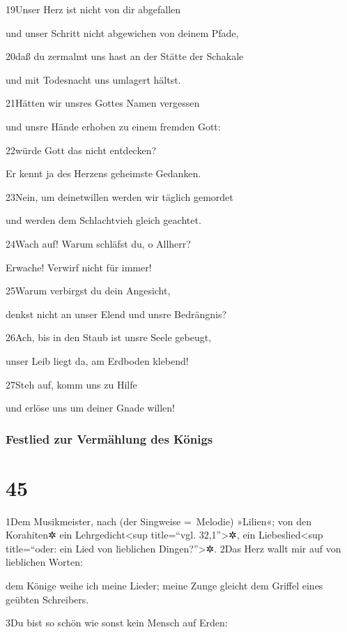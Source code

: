 19Unser Herz ist nicht von dir abgefallen

und unser Schritt nicht abgewichen von deinem Pfade,

20daß du zermalmt uns hast an der Stätte der Schakale

und mit Todesnacht uns umlagert hältst.

21Hätten wir unsres Gottes Namen vergessen

und unsre Hände erhoben zu einem fremden Gott:

22würde Gott das nicht entdecken?

Er kennt ja des Herzens geheimste Gedanken.

23Nein, um deinetwillen werden wir täglich gemordet

und werden dem Schlachtvieh gleich geachtet.

24Wach auf! Warum schläfst du, o Allherr?

Erwache! Verwirf nicht für immer!

25Warum verbirgst du dein Angesicht,

denkst nicht an unser Elend und unsre Bedrängnis?

26Ach, bis in den Staub ist unsre Seele gebeugt,

unser Leib liegt da, am Erdboden klebend!

27Steh auf, komm uns zu Hilfe

und erlöse uns um deiner Gnade willen!

\hypertarget{festlied-zur-vermuxe4hlung-des-kuxf6nigs}{%
\subsubsection{Festlied zur Vermählung des
Königs}\label{festlied-zur-vermuxe4hlung-des-kuxf6nigs}}

\hypertarget{section-44}{%
\section{45}\label{section-44}}

1Dem Musikmeister, nach (der Singweise =~Melodie) »Lilien«; von den
Korahiten✲ ein Lehrgedicht\textless sup title=``vgl.
32,1''\textgreater✲, ein Liebeslied\textless sup title=``oder: ein Lied
von lieblichen Dingen?''\textgreater✲. 2Das Herz wallt mir auf von
lieblichen Worten:

dem Könige weihe ich meine Lieder; meine Zunge gleicht dem Griffel eines
geübten Schreibers.

3Du bist so schön wie sonst kein Mensch auf Erden:

